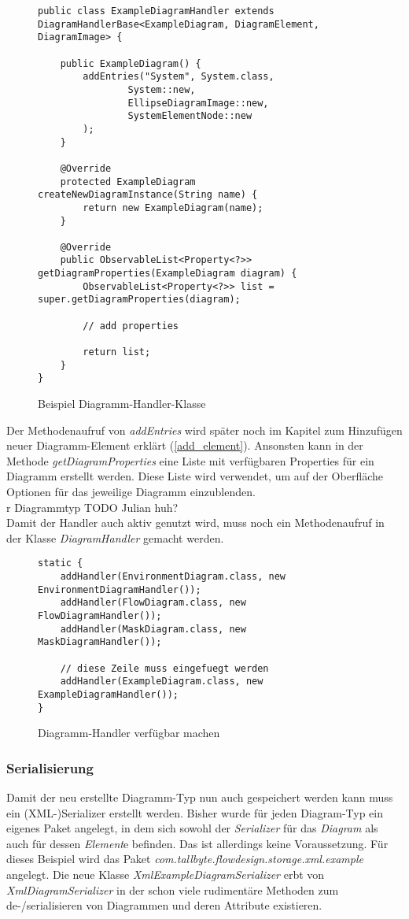\begin{figure}[h!]
	\centering
	\begin{lstlisting}
public class ExampleDiagramHandler extends DiagramHandlerBase<ExampleDiagram, DiagramElement, DiagramImage> {

    public ExampleDiagram() {
        addEntries("System", System.class,
                System::new,
                EllipseDiagramImage::new,
                SystemElementNode::new
        );
    }

    @Override
    protected ExampleDiagram createNewDiagramInstance(String name) {
        return new ExampleDiagram(name);
    }
    
    @Override
    public ObservableList<Property<?>> getDiagramProperties(ExampleDiagram diagram) {
        ObservableList<Property<?>> list = super.getDiagramProperties(diagram);

		// add properties

        return list;
    }
}
	\end{lstlisting}
	\label{diagram_handler}
	\caption{Beispiel Diagramm-Handler-Klasse}
\end{figure}
Der Methodenaufruf von \textit{addEntries} wird später noch im Kapitel zum Hinzufügen neuer Diagramm-Element
erklärt (\ref{add_element}). Ansonsten kann in der Methode \textit{getDiagramProperties} eine Liste mit verfügbaren
Properties für ein Diagramm erstellt werden. Diese Liste wird verwendet, um auf der Oberfläche Optionen für das
jeweilige Diagramm einzublenden.
\\r Diagrammtyp TODO Julian huh?
\\
Damit der Handler auch aktiv genutzt wird, muss noch ein Methodenaufruf in der Klasse \textit{DiagramHandler} gemacht
werden.

\begin{figure}[h!]
	\centering
	\begin{lstlisting}
static {
    addHandler(EnvironmentDiagram.class, new EnvironmentDiagramHandler());
    addHandler(FlowDiagram.class, new FlowDiagramHandler());
    addHandler(MaskDiagram.class, new MaskDiagramHandler());
        
    // diese Zeile muss eingefuegt werden
    addHandler(ExampleDiagram.class, new ExampleDiagramHandler());
}
	\end{lstlisting}
	\label{diagram_handler}
	\caption{Diagramm-Handler verfügbar machen}
\end{figure}
\subsubsection{Serialisierung}
Damit der neu erstellte Diagramm-Typ nun auch gespeichert werden kann muss ein (XML-)Serializer erstellt
werden. Bisher wurde für jeden Diagram-Typ ein eigenes Paket angelegt, in dem sich sowohl der 
\textit{Serializer} für das \textit{Diagram} als auch für dessen \textit{Element}e befinden. Das ist
allerdings keine Voraussetzung. 
Für dieses Beispiel wird das Paket \textit{com.tallbyte.flowdesign.storage.xml.example} angelegt.
Die neue Klasse \textit{XmlExampleDiagramSerializer} erbt von \textit{XmlDiagramSerializer} in der
schon viele rudimentäre Methoden zum de-/serialisieren von Diagrammen und deren Attribute existieren.

